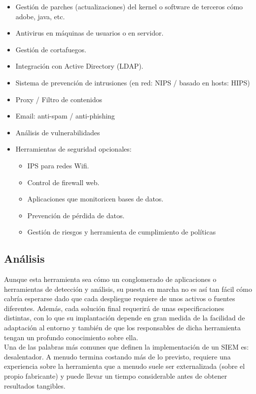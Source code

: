 \begin{itemize}
\item Gestión de parches (actualizaciones) del kernel o software de terceros cómo adobe, java, etc.
\item Antivirus en máquinas de usuarios o en servidor.
\item Gestión de cortafuegos.
\item Integración con Active Directory (LDAP).
\item Sistema de prevención de intrusiones (en red: NIPS / basado en hosts: HIPS)
\item Proxy / Filtro de contenidos
\item Email: anti-spam / anti-phishing
\item Análisis de vulnerabilidades
\item Herramientas de seguridad opcionales:
  \begin{itemize}
  \item IPS para redes Wifi.
  \item Control de firewall web.
  \item Aplicaciones que monitoricen bases de datos.
  \item Prevención de pérdida de datos.
  \item Gestión de riesgos y herramienta de cumplimiento de políticas
  \end{itemize}
\end{itemize}

\subsection{Análisis}

Aunque esta herramienta sea cómo un conglomerado de aplicaciones o herramientas de detección y análisis, su puesta en marcha no es así tan fácil cómo cabría esperarse dado que cada despliegue requiere de unos activos o fuentes diferentes. Además, cada solución final requerirá de unas especificaciones distintas, con lo que su implantación depende en gran medida de la facilidad de adaptación al entorno y también de que los responsables de dicha herramienta tengan un profundo conocimiento sobre ella.\\

Una de las palabras más comunes que definen la implementación de un SIEM es: desalentador. A menudo termina costando más de lo previsto, requiere una experiencia sobre la herramienta que a menudo suele ser externalizada (sobre el propio fabricante) y puede llevar un tiempo considerable antes de obtener resultados tangibles.\\

